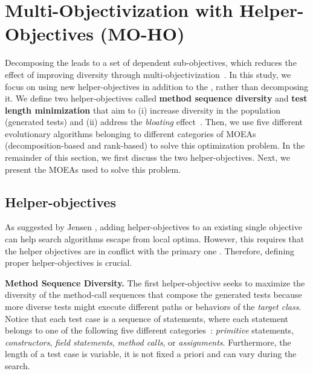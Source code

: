 
\section{Multi-Objectivization with Helper-Objectives (MO-HO)}
\label{section:approach}

Decomposing the \CrashFunction leads to a set of dependent sub-objectives, which reduces the effect of improving diversity through multi-objectivization~\cite{jensen2004helper}. In this study,  we focus on using new helper-objectives in addition to the \CrashFunction, rather than decomposing it. We define two helper-objectives called \textbf{method sequence diversity} and \textbf{test length minimization} that aim to (i) increase diversity in the population (\ie generated tests) and (ii) address the \textit{bloating} effect~\cite{mondal2015, Panichella2018}.
Then, we use five different evolutionary algorithms belonging to different categories of MOEAs (\eg decomposition-based and rank-based) to solve this optimization problem. In the remainder of this section, we first discuss the two helper-objectives. Next, we present the MOEAs used to solve this problem.

\subsection{Helper-objectives}

As suggested by Jensen \etal \cite{jensen2004helper}, adding helper-objectives to an existing single objective can help search algorithms escape from local optima. However, this requires that the helper objectives are in conflict with the primary one \cite{jensen2004helper}. Therefore, defining proper helper-objectives is crucial. 

\textbf{Method Sequence Diversity.}
%
The first helper-objective seeks to maximize the diversity of the method-call sequences that compose the generated tests because more diverse tests might execute different paths or behaviors of the \textit{target class}. Notice that each test case is a sequence of statements, where each statement belongs to 
one of the following five different categories~\cite{Panichella2018}: \textit{primitive} statements, \textit{constructors}, \textit{field statements}, \textit{method calls}, or \textit{assignments}. Furthermore, the length of a test case is variable, \ie it is not fixed a priori and can vary during the search.


